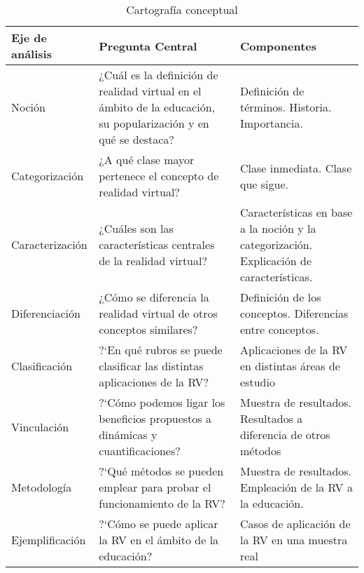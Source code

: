 \begin{table}[!h]
   \caption{Cartografía conceptual}
   \begin{tabularx}{\textwidth}{
         | >{\raggedright\arraybackslash}X 
  | >{\centering\arraybackslash}X 
  | >{\raggedleft\arraybackslash}X |
      }
      Eje de análisis & Pregunta Central & Componentes\\
      \hline
      Noción & ¿Cuál es la definición de realidad virtual en el ámbito de la educación, su popularización y en qu\'e se destaca? & Definición de términos. Historia. Importancia.\\
      Categorización & ¿A qué clase mayor pertenece el concepto de realidad virtual? & Clase inmediata. Clase que sigue.\\
      Caracterización & ¿Cuáles son las características centrales de la realidad virtual? & Características en base a la noción y la categorización. Explicación de características.\\
      Diferenciación & ¿Cómo se diferencia la realidad virtual de otros conceptos similares? & Definición de los conceptos. Diferencias entre conceptos.\\
      Clasificación & ?`En qu\'e rubros se puede clasificar las distintas aplicaciones de la RV? & Aplicaciones de la RV en distintas áreas de estudio\\
      Vinculación & ?`C\'omo podemos ligar los beneficios propuestos a dinámicas y cuantificaciones?& Muestra de resultados. Resultados a diferencia de otros métodos\\
      Metodología & ?`Qu\'e métodos se pueden emplear para probar el funcionamiento de la RV?& Muestra de resultados. Empleaci\'on de la RV a la educación.\\
      Ejemplificación & ?`C\'omo se puede aplicar la RV en el ámbito de la educación? & Casos de aplicación de la RV en una muestra real\\
   \end{tabularx}
\end{table}

